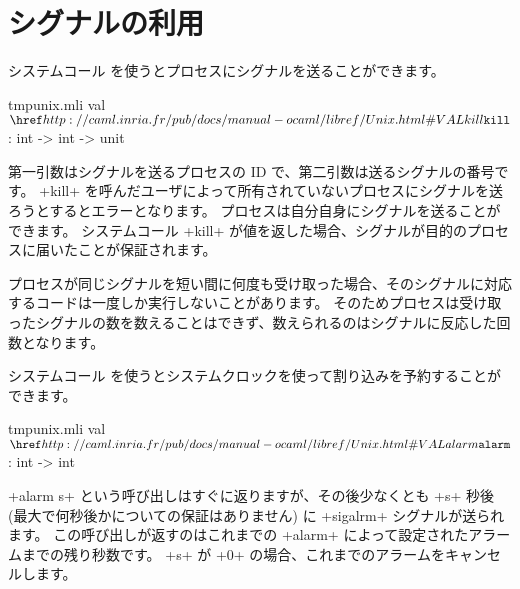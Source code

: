 \section{\label{sec/usingsignals}シグナルの利用}

システムコール  を使うとプロセスにシグナルを送ることができます。
%
\begin{listingcodefile}{tmpunix.mli}
val $\libvalue{Unix}{kill}$ : int -> int -> unit
\end{listingcodefile}
%
第一引数はシグナルを送るプロセスの ID で、第二引数は送るシグナルの番号です。
\ml+kill+ を呼んだユーザによって所有されていないプロセスにシグナルを送ろうとするとエラーとなります。
プロセスは自分自身にシグナルを送ることができます。
システムコール \ml+kill+ が値を返した場合、シグナルが目的のプロセスに届いたことが保証されます。

プロセスが同じシグナルを短い間に何度も受け取った場合、そのシグナルに対応するコードは一度しか実行しないことがあります。
そのためプロセスは受け取ったシグナルの数を数えることはできず、数えられるのはシグナルに反応した回数となります。

システムコール  を使うとシステムクロックを使って割り込みを予約することができます。
%
\begin{listingcodefile}{tmpunix.mli}
val $\libvalue{Unix}{alarm}$ : int -> int
\end{listingcodefile}
%
\ml+alarm s+ という呼び出しはすぐに返りますが、その後少なくとも \ml+s+ 秒後
(最大で何秒後かについての保証はありません) に \ml+sigalrm+ シグナルが送られます。
この呼び出しが返すのはこれまでの \ml+alarm+ によって設定されたアラームまでの残り秒数です。
\ml+s+ が \ml+0+ の場合、これまでのアラームをキャンセルします。

